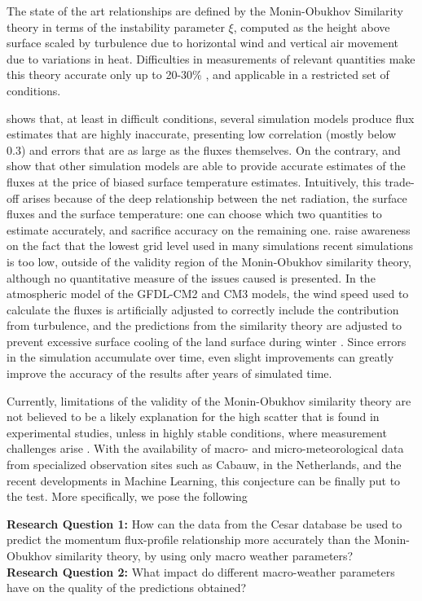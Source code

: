 \documentclass[a4paper,11pt]{kth-mag}
\begin{document}
The state of the art relationships are defined by the Monin-Obukhov Similarity theory in terms of the instability parameter $\xi$, computed as the height above surface scaled by turbulence due to horizontal wind and vertical air movement due to variations in heat. Difficulties in measurements of relevant quantities make this theory accurate only up to 20-30\% \citep{basicatm}, and applicable in a restricted set of conditions.

\cite{sheba} shows that, at least in difficult conditions, several simulation models produce flux estimates that are highly inaccurate, presenting low correlation (mostly below 0.3) and errors that are as large as the fluxes themselves. On the contrary, \cite{boundary_layer_impact_in_sim} and \citep{most_sim} show that other simulation models are able to provide accurate estimates of the fluxes at the price of biased surface temperature estimates. Intuitively, this trade-off arises because of the deep relationship between the net radiation, the surface fluxes and the surface temperature: one can choose which two quantities to estimate accurately, and sacrifice accuracy on the remaining one. \cite{most_les} raise awareness on the fact that the lowest grid level used in many simulations recent simulations is too low, outside of the validity region of the Monin-Obukhov similarity theory, although no quantitative measure of the issues caused is presented. In the atmospheric model of the GFDL-CM2 and CM3 models, the wind speed used to calculate the fluxes is artificially adjusted to correctly include the contribution from turbulence, and the predictions from the similarity theory are adjusted to prevent excessive surface cooling of the land surface during winter \citep{gfdl_am2}. Since errors in the simulation accumulate over time, even slight improvements can greatly improve the accuracy of the results after years of simulated time.

Currently, limitations of the validity of the Monin-Obukhov similarity theory are not believed to be a likely explanation for the high scatter that is found in experimental studies, unless in highly stable conditions, where measurement challenges arise \citep{basicatm}. With the availability of macro- and micro-meteorological data from specialized observation sites such as Cabauw, in the Netherlands, and the recent developments in Machine Learning, this conjecture can be finally put to the test. More specifically, we pose the following \\

\begin{tcolorbox}
\textbf{Research Question 1:} How can the data from the Cesar database be used to predict the momentum flux-profile relationship more accurately than the Monin-Obukhov similarity theory, by using only macro weather parameters? \\

\noindent\textbf{Research Question 2:} What impact do different macro-weather parameters have on the quality of the predictions obtained?
\end{tcolorbox}
\end{document}
